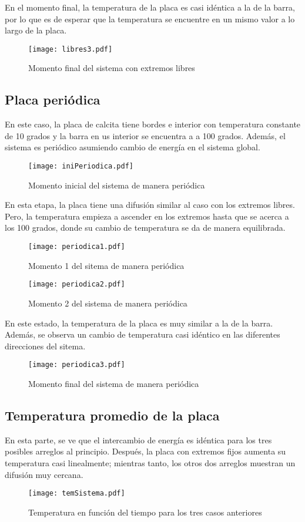 \documentclass[letterpaper,12pt]{article}
\begin{document}
En el momento final, la temperatura de la placa es casi idéntica a la de la barra, por lo que es de esperar que la temperatura se encuentre en un mismo valor a lo largo de la placa.

\begin{figure}[h!]
	\centering
	\caption{Momento final del sistema con extremos libres}
	\texttt{[image: libres3.pdf]}
\end{figure}

\subsection*{Placa periódica}

En este caso, la placa de calcita tiene bordes e interior con temperatura constante de 10 grados y la barra en us interior se encuentra a a 100 grados. Además, el sistema es periódico asumiendo cambio de energía en el sistema global.

\begin{figure}[h!]
	\centering
	\caption{Momento inicial del sistema de manera periódica}
	\texttt{[image: iniPeriodica.pdf]}
\end{figure}

En esta etapa, la placa tiene una difusión similar al caso con los extremos libres. Pero, la temperatura empieza a ascender en los extremos hasta que se acerca a los 100 grados, donde su cambio de temperatura se da de manera equilibrada.

\begin{figure}[h!]
	\centering
	\caption{Momento 1 del sitema de manera periódica}
	\texttt{[image: periodica1.pdf]}
\end{figure}

\begin{figure}[h!]
	\centering
	\caption{Momento 2 del sistema de manera periódica}
	\texttt{[image: periodica2.pdf]}
\end{figure}

En este estado, la temperatura de la placa es muy similar a la de la barra. Además, se observa un cambio de temperatura casi idéntico en las diferentes direcciones del sitema.

\begin{figure}[h!]
	\centering
	\caption{Momento final del sistema de manera periódica}
	\texttt{[image: periodica3.pdf]}
\end{figure}

\subsection*{Temperatura promedio de la placa}

En esta parte, se ve que el intercambio de energía es idéntica para los tres posibles arreglos al principio. Después, la placa con extremos fijos aumenta su temperatura casi linealmente; mientras tanto, los otros dos arreglos muestran un difusión muy cercana.

\begin{figure}[h!]
	\centering
	\caption{Temperatura en función del tiempo para los tres casos anteriores}
	\texttt{[image: temSistema.pdf]}
\end{figure}
\end{document}
